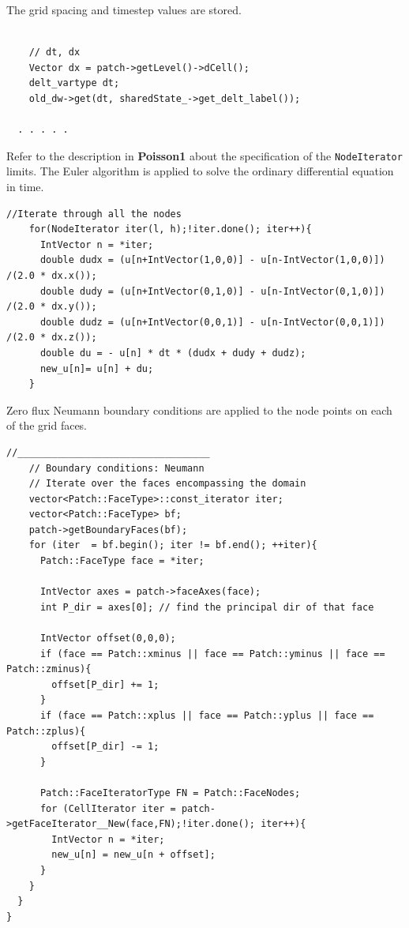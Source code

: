 \documentclass[12pt]{report}
\begin{document}
The grid spacing and timestep values are stored.

\begin{Verbatim}[fontsize=\footnotesize]

    // dt, dx
    Vector dx = patch->getLevel()->dCell();
    delt_vartype dt;
    old_dw->get(dt, sharedState_->get_delt_label());
    
  . . . . .  
\end{Verbatim}

Refer to the description in \textbf{Poisson1} about the specification
of the \texttt{NodeIterator} limits.  The Euler algorithm is applied to solve
the ordinary differential equation in time.

\begin{Verbatim}[fontsize=\footnotesize]                   
    //Iterate through all the nodes
    for(NodeIterator iter(l, h);!iter.done(); iter++){    
      IntVector n = *iter;
      double dudx = (u[n+IntVector(1,0,0)] - u[n-IntVector(1,0,0)]) /(2.0 * dx.x());
      double dudy = (u[n+IntVector(0,1,0)] - u[n-IntVector(0,1,0)]) /(2.0 * dx.y());
      double dudz = (u[n+IntVector(0,0,1)] - u[n-IntVector(0,0,1)]) /(2.0 * dx.z());
      double du = - u[n] * dt * (dudx + dudy + dudz);
      new_u[n]= u[n] + du;
    }

\end{Verbatim}

Zero flux Neumann boundary conditions are applied to the node points
on each of the grid faces.


\begin{Verbatim}[fontsize=\footnotesize]
    //__________________________________
    // Boundary conditions: Neumann
    // Iterate over the faces encompassing the domain
    vector<Patch::FaceType>::const_iterator iter;
    vector<Patch::FaceType> bf;
    patch->getBoundaryFaces(bf);
    for (iter  = bf.begin(); iter != bf.end(); ++iter){
      Patch::FaceType face = *iter;

      IntVector axes = patch->faceAxes(face);
      int P_dir = axes[0]; // find the principal dir of that face

      IntVector offset(0,0,0);
      if (face == Patch::xminus || face == Patch::yminus || face == Patch::zminus){
        offset[P_dir] += 1; 
      }
      if (face == Patch::xplus || face == Patch::yplus || face == Patch::zplus){
        offset[P_dir] -= 1;
      }

      Patch::FaceIteratorType FN = Patch::FaceNodes;
      for (CellIterator iter = patch->getFaceIterator__New(face,FN);!iter.done(); iter++){
        IntVector n = *iter;
        new_u[n] = new_u[n + offset];
      }
    }
  }
}

\end{Verbatim}
\end{document}
